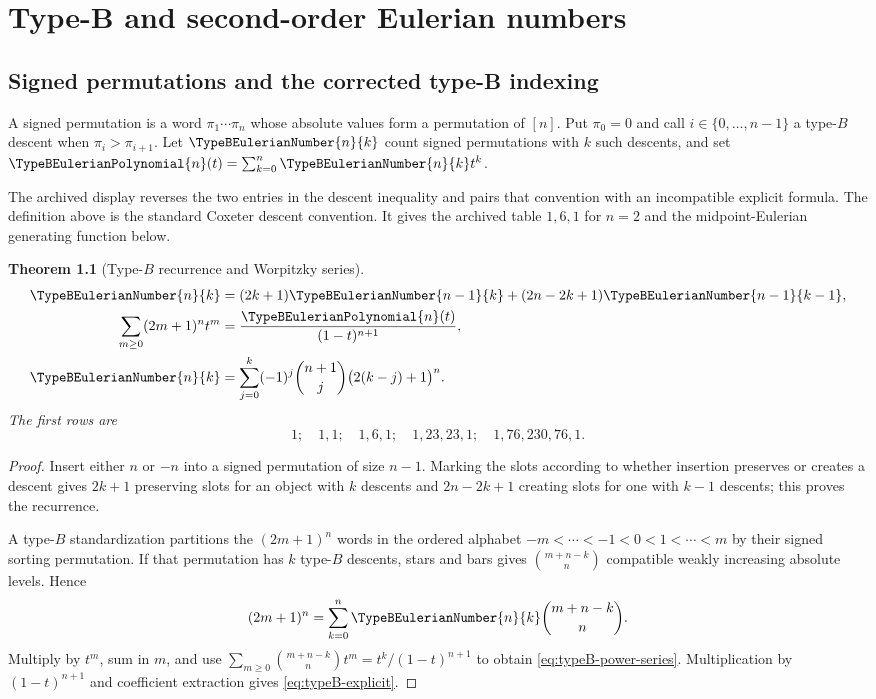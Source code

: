 \documentclass[11pt,a4paper,oneside,openany]{book}
\newtheorem{theorem}{Theorem}[chapter]
\theoremstyle{definition}
\theoremstyle{remark}
\begin{document}
\chapter{Type-B and second-order Eulerian numbers}

\section{Signed permutations and the corrected type-B indexing}
A signed permutation is a word $\pi_1\cdots\pi_n$ whose absolute values form a
permutation of $[n]$.  Put $\pi_0=0$ and call
$i\in\{0,\ldots,n-1\}$ a type-$B$ descent when $\pi_i>\pi_{i+1}$.
Let $\TypeBEulerianNumber{n}{k}$ count signed permutations with $k$ such descents, and set
$\TypeBEulerianPolynomial{n}(t)=\sum_{k=0}^{n}\TypeBEulerianNumber{n}{k}t^k$.

\begin{auditbox}
The archived display reverses the two entries in the descent inequality and pairs
that convention with an incompatible explicit formula.  The definition above is
the standard Coxeter descent convention.  It gives the archived table
$1,6,1$ for $n=2$ and the midpoint-Eulerian generating function below.
\end{auditbox}

\begin{theorem}[Type-$B$ recurrence and Worpitzky series]\label{thm:typeB-eulerian}
\begin{align}
 \TypeBEulerianNumber{n}{k}&=(2k+1)\TypeBEulerianNumber{n-1}{k}+(2n-2k+1)\TypeBEulerianNumber{n-1}{k-1},
 \label{eq:typeB-recurrence}\\
 \sum_{m\ge0}(2m+1)^nt^m&=\frac{\TypeBEulerianPolynomial{n}(t)}{(1-t)^{n+1}},
 \label{eq:typeB-power-series}\\
 \TypeBEulerianNumber{n}{k}&=\sum_{j=0}^{k}(-1)^j\binom{n+1}{j}
             \bigl(2(k-j)+1\bigr)^n.
 \label{eq:typeB-explicit}
\end{align}
The first rows are
\[
1;\quad 1,1;\quad1,6,1;\quad1,23,23,1;\quad1,76,230,76,1.
\]
\end{theorem}
\begin{proof}
Insert either $n$ or $-n$ into a signed permutation of size $n-1$.  Marking the
slots according to whether insertion preserves or creates a descent gives
$2k+1$ preserving slots for an object with $k$ descents and
$2n-2k+1$ creating slots for one with $k-1$ descents; this proves the recurrence.

A type-$B$ standardization partitions the $(2m+1)^n$ words in the ordered alphabet
$-m<\cdots<-1<0<1<\cdots<m$ by their signed sorting permutation.  If that
permutation has $k$ type-$B$ descents, stars and bars gives
$\binom{m+n-k}{n}$ compatible weakly increasing absolute levels.  Hence
\[
 (2m+1)^n=\sum_{k=0}^{n}\TypeBEulerianNumber{n}{k}\binom{m+n-k}{n}.
\]
Multiply by $t^m$, sum in $m$, and use
$\sum_{m\ge0}\binom{m+n-k}{n}t^m=t^k/(1-t)^{n+1}$ to obtain
\eqref{eq:typeB-power-series}.  Multiplication by $(1-t)^{n+1}$ and coefficient
extraction gives \eqref{eq:typeB-explicit}.
\end{proof}
\end{document}

